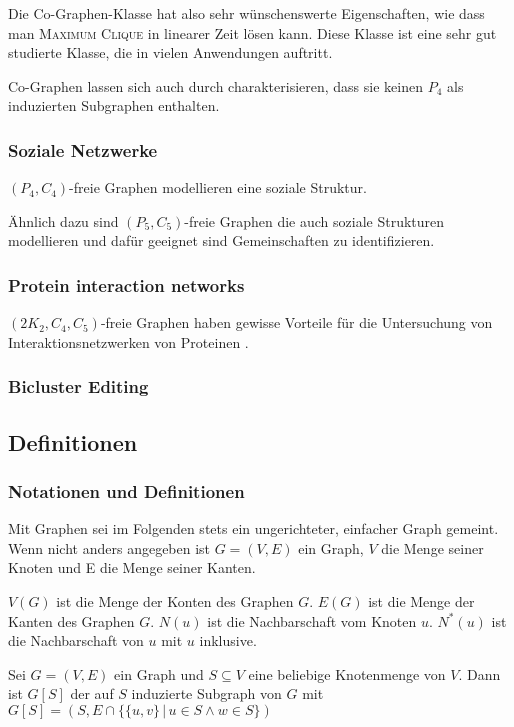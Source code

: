 \documentclass[12pt,a4paper,onecolumn,oneside,titlepage]{article}
\begin{document}
Die Co-Graphen-Klasse hat also sehr wünschenswerte Eigenschaften, wie dass man \textsc{Maximum Clique} in linearer Zeit lösen kann. Diese Klasse ist eine sehr gut studierte Klasse, die in vielen  Anwendungen auftritt.

Co-Graphen lassen sich auch durch charakterisieren, dass sie keinen $P_4$ als induzierten Subgraphen enthalten.
\cite{NastosG13}
\subsubsection{Soziale Netzwerke}

$(P_4,C_4)$-freie Graphen modellieren eine soziale Struktur. \cite{NastosG13}

Ähnlich dazu sind $(P_5,C_5)$-freie Graphen die auch soziale Strukturen modellieren und dafür geeignet sind Gemeinschaften zu identifizieren. \cite{Schoch15}

\subsubsection{Protein interaction networks}
$(2K_2, C_4, C_5)$-freie Graphen haben gewisse Vorteile für die Untersuchung von Interaktionsnetzwerken von Proteinen \cite{BrucknerHK15}.

\subsubsection{Bicluster Editing}

\cite{De12} \cite{Madeira04} 

\subsection{Definitionen}
\subsubsection{Notationen und Definitionen}
\label{sec:notation}
Mit Graphen sei im Folgenden stets ein ungerichteter, einfacher Graph gemeint. Wenn nicht anders angegeben ist $G=(V,E)$ ein Graph, $V$ die Menge seiner Knoten und E die Menge seiner Kanten.

$V(G)$ ist die Menge der Konten des Graphen $G$. $E(G)$ ist die Menge der Kanten des Graphen $G$. $N(u)$ ist die Nachbarschaft vom Knoten $u$. $N^{*}(u)$ ist die Nachbarschaft von $u$ mit $u$ inklusive.

Sei $G = (V,E)$ ein Graph und $S \subseteq V$ eine beliebige Knotenmenge von $V$. 
Dann ist $G[S]$ der auf $S$ induzierte Subgraph von $G$ mit $G[S] = (S, E \cap \{\{u,v\} \,|\, u \in S \land w \in S\})$
\end{document}
